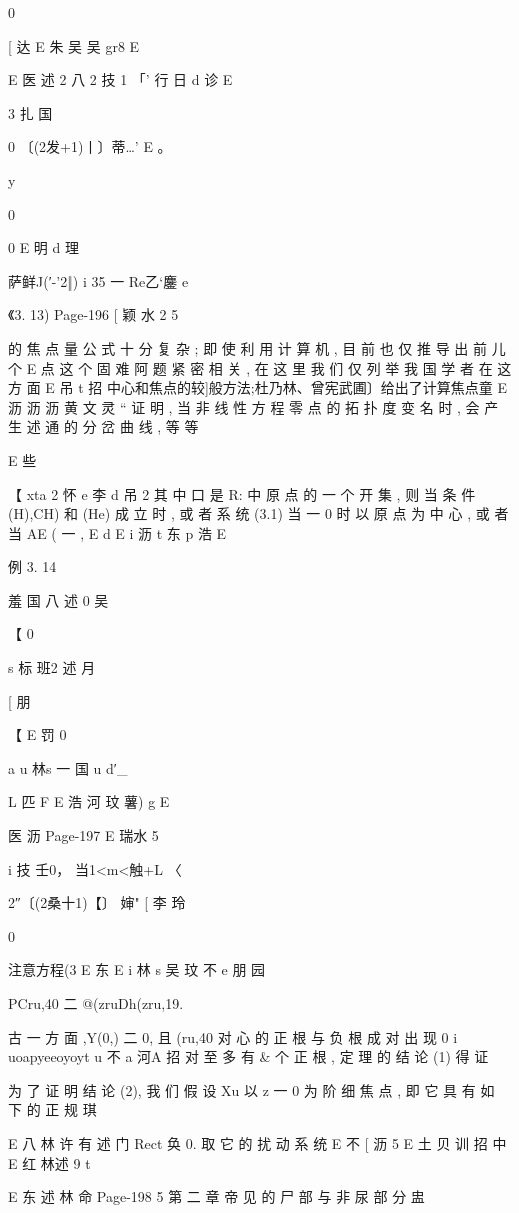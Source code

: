 {{{{{{{{{{{{{{{{0

[ 达
E 朱 吴 吴 gr8
E

E 医 述 2 八 2 技 1
「' 行 日 d 诊
E

3 扎 国

0 〔(2发+1)丨〕蒂…' E
。

y

0

0 E 明 d 理

萨鲜J(′-'2‖) i 35 一 Re乙`鏖
e

《3. 13)
Page-196
[ 颖 水 2 5

的 焦 点 量 公 式 十 分 复 杂 ; 即 使 利 用 计 算 机 , 目 前 也 仅 推 导 出 前 儿 个
E
点 这 个 固 难 阿 题 紧 密 相 关 , 在 这 里 我 们 仅 列 举 我 国 学 者 在 这 方 面
E 吊 t 招
中心和焦点的较]般方法;杜乃林、曾宪武圃〕给出了计算焦点童
E 沥 沥
沥
黄 文 灵 “ 证 明 , 当 非 线 性 方 程 零 点 的 拓 扑 度 变 名 时 , 会 产 生 述 通
的 分 岔 曲 线 , 等 等

E 些

【 xta 2 怀 e 李 d 吊 2
其 中 口 是 R: 中 原 点 的 一 个 开 集 , 则 当 条 件 (H),CH) 和 (He) 成
立 时 , 或 者 系 统 (3.1) 当 一 0 时 以 原 点 为 中 心 , 或 者 当 AE ( 一 ,
E
d
E i 沥 t 东 p 浩
E

例 3. 14

羞 国 八 述 0 吴

【
0

s 标 班2 述 月

[ 朋

【
E 罚 0

a u 林s 一 国
u
d′_

L 匹
F E 浩 河 玟 薯) g
E

医 沥
Page-197
E 瑞水 5

i 技
壬0， 当1<m<触+L
〈

2″〔(2桑十1)【〕 婶" [ 李 玲

0

注意方程(3 E 东
E
i
林
s 吴 玟 不 e 朋
园

PCru,40 二 @(zruDh(zru,19.

古 一 方 面 ,Y(0,) 二 0, 且 (ru,40 对 心 的 正 根 与 负 根 成 对 出 现
0 i
uoapyeeoyoyt u 不 a 河A 招
对 至 多 有 & 个 正 根 , 定 理 的 结 论 (1) 得 证

为 了 证 明 结 论 (2), 我 们 假 设 Xu 以 z 一 0 为 阶 细 焦 点 , 即 它
具 有 如 下 的 正 规 琪

E 八 林 许 有 述 门 Rect 奂 0.
取 它 的 扰 动 系 统
E 不
[ 沥 5
E 土 贝 训 招 中
E
红 林述
9
t

E 东 述 林
命
Page-198
5 第 二 章 帝 见 的 尸 部 与 非 尿 部 分 盅

}}}}}}}}}}}}}}}}
